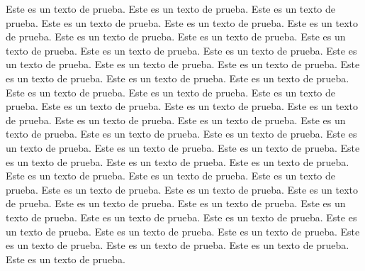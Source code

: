 \documentclass[12pt]{article}
\begin{document}
\newpage
{}
\setcounter{page}{50}
Este es un texto de prueba. Este es un texto de prueba. 
Este es un texto de prueba. Este es un texto de prueba. 
Este es un texto de prueba. Este es un texto de prueba.
Este es un texto de prueba. Este es un texto de prueba. 
Este es un texto de prueba. Este es un texto de prueba.
Este es un texto de prueba. Este es un texto de prueba.
Este es un texto de prueba. Este es un texto de prueba. 
Este es un texto de prueba. Este es un texto de prueba. 
Este es un texto de prueba. Este es un texto de prueba.
Este es un texto de prueba. Este es un texto de prueba. 
Este es un texto de prueba. Este es un texto de prueba. 
Este es un texto de prueba. Este es un texto de prueba.
Este es un texto de prueba. Este es un texto de prueba.
Este es un texto de prueba. Este es un texto de prueba.
Este es un texto de prueba. Este es un texto de prueba. 
Este es un texto de prueba. Este es un texto de prueba.
Este es un texto de prueba. Este es un texto de prueba. 
Este es un texto de prueba. Este es un texto de prueba. 
Este es un texto de prueba. Este es un texto de prueba.
Este es un texto de prueba. Este es un texto de prueba. 
Este es un texto de prueba. Este es un texto de prueba.
Este es un texto de prueba. Este es un texto de prueba.
Este es un texto de prueba. Este es un texto de prueba. 
Este es un texto de prueba. Este es un texto de prueba.
Este es un texto de prueba. Este es un texto de prueba. 
Este es un texto de prueba. Este es un texto de prueba. 
\end{document}
